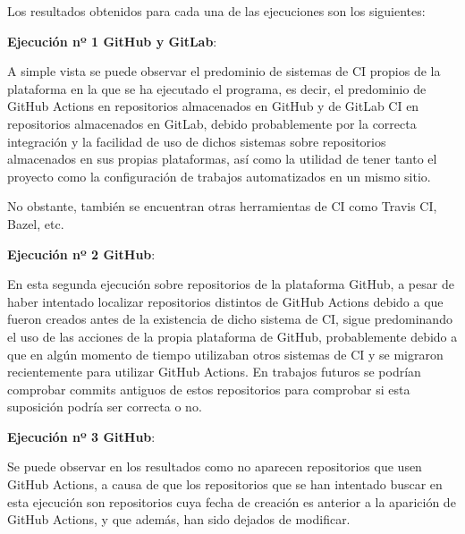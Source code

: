 Los resultados obtenidos para cada una de las ejecuciones son los siguientes:
\begin{compactitem}
    \item \textbf{Ejecución nº 1 GitHub y GitLab}: 
    
    A simple vista se puede observar el predominio de sistemas de CI propios de la plataforma en la que se ha ejecutado el programa, es decir, el predominio de GitHub Actions en repositorios almacenados en GitHub y de GitLab CI en repositorios almacenados en GitLab, debido probablemente por la correcta integración y la facilidad de uso de dichos sistemas sobre repositorios almacenados en sus propias plataformas, así como la utilidad de tener tanto el proyecto como la configuración de trabajos automatizados en un mismo sitio.
    
    No obstante, también se encuentran otras herramientas de CI como Travis CI, Bazel, etc.
    \item \textbf{Ejecución nº 2 GitHub}:
    
    En esta segunda ejecución sobre repositorios de la plataforma GitHub, a pesar de haber intentado localizar repositorios distintos de GitHub Actions debido a que fueron creados antes de la existencia de dicho sistema de CI, sigue predominando el uso de las acciones de la propia plataforma de GitHub, probablemente debido a que en algún momento de tiempo utilizaban otros sistemas de CI y se migraron recientemente para utilizar GitHub Actions. En trabajos futuros se podrían comprobar commits antiguos de estos repositorios para comprobar si esta suposición podría ser correcta o no.
    \item \textbf{Ejecución nº 3 GitHub}:
    
    Se puede observar en los resultados como no aparecen repositorios que usen GitHub Actions, a causa de que los repositorios que se han intentado buscar en esta ejecución son repositorios cuya fecha de creación es anterior a la aparición de GitHub Actions, y que además, han sido dejados de modificar.
\end{compactitem}